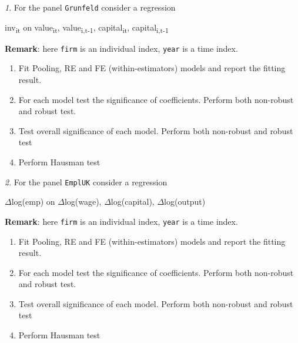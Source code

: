 \documentclass[12pt]{article}
\theoremstyle{remark}
\newtheorem{exercise}{}[section]
\begin{document}
\begin{exercise}
For the panel \texttt{Grunfeld} consider a regression
\begin{center}
	inv\textsubscript{it} on value\textsubscript{it}, value\textsubscript{i,t-1}, 
	capital\textsubscript{it}, capital\textsubscript{i,t-1}
\end{center}
\textbf{Remark}: here \texttt{firm} is an individual index, 
\texttt{year} is a time index.
\begin{enumerate}
	\item Fit Pooling, RE and FE (within-estimators) models
	and report the fitting result.
	\item For each model test the significance of coefficients. Perform both
	non-robust and robust test.
	\item Test overall significance of each model. Perform both
	non-robust and robust test
	\item Perform Hausman test
\end{enumerate}
\end{exercise}

\begin{exercise}
For the panel \texttt{EmplUK} consider a regression
\begin{center}
	\(\Delta\)log(emp) on \(\Delta\)log(wage), \(\Delta\)log(capital), \(\Delta\)log(output) 
\end{center}
\textbf{Remark}: here \texttt{firm} is an individual index, 
\texttt{year} is a time index.
\begin{enumerate}
	\item Fit Pooling, RE and FE (within-estimators) models
	and report the fitting result.
	\item For each model test the significance of coefficients. Perform both
	non-robust and robust test.
	\item Test overall significance of each model. Perform both
	non-robust and robust test
	\item Perform Hausman test
\end{enumerate}
\end{exercise}
\end{document}
